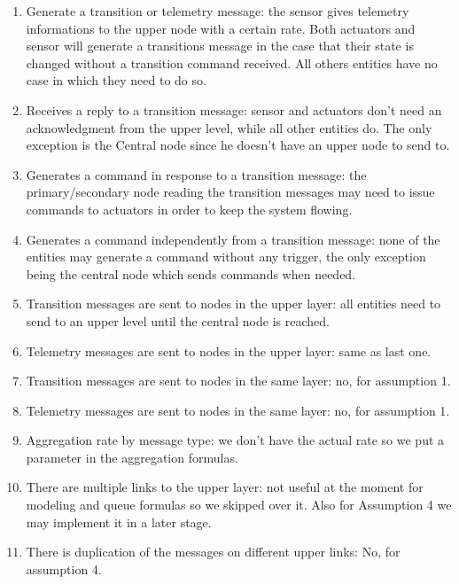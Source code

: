 \documentclass[11pt]{article}
\begin{document}
\begin{enumerate}
\item Generate a transition or telemetry message: the sensor gives telemetry informations to the upper node with a certain rate. Both actuators and sensor will generate a transitions message in the case that their state is changed without a transition command received. All others entities have no case in which they need to do so.
\item Receives a reply to a transition message: sensor and actuators don't need an acknowledgment from the upper level, while all other entities do. The only exception is the Central node since he doesn't have an upper node to send to.
\item Generates a command in response to a transition message: the primary/secondary node reading the transition messages may need to issue commands to actuators in order to keep the system flowing.
\item Generates a command independently from a transition message: none of the entities may generate a command without any trigger, the only exception being the central node which sends commands when needed.
\item Transition messages are sent to nodes in the upper layer: all entities need to send to an upper level until the central node is reached.
\item Telemetry messages are sent to nodes in the upper layer: same as last one.
\item Transition messages are sent to nodes in the same layer: no, for assumption 1.
\item Telemetry messages are sent to nodes in the same layer: no, for assumption 1.
\item Aggregation rate by message type: we don't have the actual rate so we put a parameter in the aggregation formulas.
\item There are multiple links to the upper layer: not useful at the moment for modeling and queue formulas so we skipped over it. Also for Assumption 4 we may implement it in a later stage.
\item There is duplication of the messages on different upper links: No, for assumption 4.
\end{enumerate}
\end{document}
